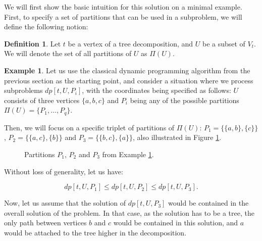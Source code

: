 \documentclass[thesis=M,english,hidelinks]{FITthesis}[2012/10/20]
\theoremstyle{definition}
\newtheorem{definition}{Definition}
\newtheorem{example}{Example}
\begin{document}
We will first show the basic intuition for this solution on a minimal example. First, to specify a set of partitions
that can be used in a subproblem, we will define the following notion:

\begin{definition}
    Let $t$ be a vertex of a tree decomposition, and $U$ be a subset of $V_t$. We will denote the set
    of all partitions of $U$ as $\Pi(U)$.
\end{definition}

\begin{example}
    \label{ex:cutmatrix}
    Let us use the classical dynamic programming algorithm from the previous section as the starting point, and consider
    a situation where we process subproblems $dp[t, U, P_i]$, with the coordinates being specified as follows: $U$
    consists of three vertices $\{a, b, c\}$ and $P_i$ being any of the possible partitions $\Pi(U) = \{P_1, \ldots,
    P_q\}$.
    
    Then, we will focus on a specific triplet of partitions of $\Pi(U)$: $P_1 = \{\{a, b\}, \{c\}\}$, $P_2 = \{\{a, c\},
    \{b\}\}$ and $P_3 = \{\{b, c\}, \{a\}\}$, also illustrated in Figure \ref{fig:partitions}.
\end{example}

\begin{figure}[ht]
    \centering
    \caption{Partitions $P_1$, $P_2$ and $P_3$ from Example \ref{ex:cutmatrix}.}
    \label{fig:partitions}
\end{figure}

Without loss of generality, let us have:

$$
dp[t, U, P_1] \leq dp[t, U, P_2] \leq dp[t, U, P_3].
$$

Now, let us assume that the solution of $dp[t, U, P_3]$ would be contained in the overall solution of the problem. In
that case, as the solution has to be a tree, the only path between vertices $b$ and $c$ would be contained in this
solution, and $a$ would be attached to the tree higher in the decomposition.
\end{document}

